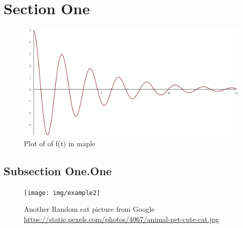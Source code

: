 
\section{Section One}
\lipsum[1-2]

\begin{figure}[h]
  \centering
  \includegraphics[width=\linewidth]{img/plot}
  \caption{Plot of of f(t) in maple}
  \label{img:function}
\end{figure}

\lipsum[3-4]

\subsection{Subsection One.One}
\lipsum[5]

\begin{figure}[ht]
  \centering
  \texttt{[image: img/example2]}
  \caption{Another Random cat picture from Google \protect\url{https://static.pexels.com/photos/4067/animal-pet-cute-cat.jpg}}
  \label{img:cat2}
\end{figure}

